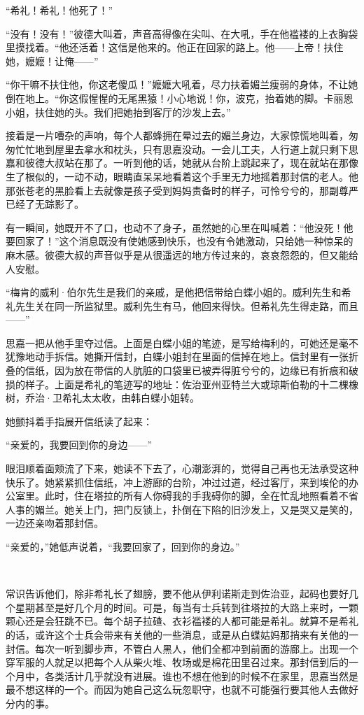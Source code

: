 \par “希礼！希礼！他死了！”
\par “没有！没有！”彼德大叫着，声音高得像在尖叫、在大吼，手在他褴褛的上衣胸袋里摸找着。“他还活着！这信是他来的。他正在回家的路上。他——上帝！扶住她，嬷嬷！让俺——”
\par “你干嘛不扶住他，你这老傻瓜！”嬷嬷大吼着，尽力扶着媚兰瘦弱的身体，不让她倒在地上。“你这假惺惺的无尾黑猿！小心地说！你，波克，抬着她的脚。卡丽恩小姐，扶住她的头。我们把她抬到客厅的沙发上去。”
\par 接着是一片嘈杂的声响，每个人都蜂拥在晕过去的媚兰身边，大家惊慌地叫着，匆匆忙忙地到屋里去拿水和枕头，只有思嘉没动。一会儿工夫，人行道上就只剩下思嘉和彼德大叔站在那了。一听到他的话，她就从台阶上跳起来了，现在就站在那像生了根似的，一动不动，眼睛直呆呆地看着这个手里无力地摇着那封信的老人。他那张苍老的黑脸看上去就像是孩子受到妈妈责备时的样子，可怜兮兮的，那副尊严已经了无踪影了。
\par 有一瞬间，她既开不了口，也动不了身子，虽然她的心里在叫喊着：“他没死！他要回家了！”这个消息既没有使她感到快乐，也没有令她激动，只给她一种惊呆的麻木感。彼德大叔的声音似乎是从很遥远的地方传过来的，哀哀怨怨的，但又能给人安慰。
\par “梅肯的威利·伯尔先生是我们的亲戚，是他把信带给白蝶小姐的。威利先生和希礼先生关在同一所监狱里。威利先生有马，他回来得快。但希礼先生得走路，而且——”
\par 思嘉一把从他手里夺过信。上面是白蝶小姐的笔迹，是写给梅利的，可她还是毫不犹豫地动手拆信。她撕开信封，白蝶小姐封在里面的信掉在地上。信封里有一张折叠的信纸，因为放在带信的人肮脏的口袋里已被弄得脏兮兮的，边缘已有折痕和破损的样子。上面是希礼的笔迹写的地址：佐治亚州亚特兰大或琼斯伯勒的十二棵橡树，乔治·卫希礼太太收，由韩白蝶小姐转。
\par 她颤抖着手指展开信纸读了起来：
\par “亲爱的，我要回到你的身边——”
\par 眼泪顺着面颊流了下来，她读不下去了，心潮澎湃的，觉得自己再也无法承受这种快乐了。她紧紧抓住信纸，冲上游廊的台阶，冲过过道，经过客厅，来到埃伦的办公室里。此时，住在塔拉的所有人你碍我的手我碍你的脚，全在忙乱地照看着不省人事的媚兰。她关上门，把门反锁上，扑倒在下陷的旧沙发上，又是哭又是笑的，一边还亲吻着那封信。
\par “亲爱的，”她低声说着，“我要回家了，回到你的身边。”
\par  
\par 常识告诉他们，除非希礼长了翅膀，要不他从伊利诺斯走到佐治亚，起码也要好几个星期甚至是好几个月的时间。可是，每当有士兵转到往塔拉的大路上来时，一颗颗心还是会狂跳不已。每个胡子拉碴、衣衫褴褛的人都可能是希礼。就算不是希礼的话，或许这个士兵会带来有关他的一些消息，或是从白蝶姑妈那捎来有关他的一封信。每次一听到脚步声，不管白人黑人，他们全都冲到前面的游廊上。出现一个穿军服的人就足以把每个人从柴火堆、牧场或是棉花田里召过来。那封信到后的一个月中，各类活计几乎就没有进展。谁也不想在他到的时候不在家里，思嘉当然是最不想这样的一个。而因为她自己这么玩忽职守，也就不可能强行要其他人去做好分内的事。
